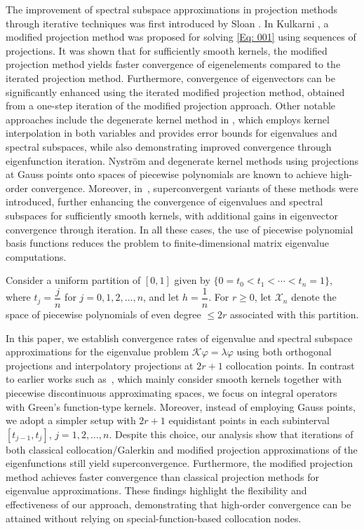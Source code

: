 \documentclass[pdflatex, sn-mathphys-num]{sn-jnl}%
\theoremstyle{thmstyleone}%
\theoremstyle{thmstyletwo}%
\theoremstyle{thmstylethree}%
\begin{document}
The improvement of spectral subspace approximations in projection methods through iterative techniques was first introduced by Sloan \cite{Sloan1}. In Kulkarni \cite{RPK5, RPK6}, a modified projection method was proposed for solving \eqref{Eq: 001} using sequences of projections. It was shown that for sufficiently smooth kernels, the modified projection method yields faster convergence of eigenelements compared to the iterated projection method. Furthermore, convergence of eigenvectors can be significantly enhanced using the iterated modified projection method, obtained from a one-step iteration of the modified projection approach. Other notable approaches include the degenerate kernel method in \cite{Gnan1}, which employs kernel interpolation in both variables and provides error bounds for eigenvalues and spectral subspaces, while also demonstrating improved convergence through eigenfunction iteration. Nystr\"om and degenerate kernel methods using projections at Gauss points onto spaces of piecewise polynomials are known to achieve high-order convergence. Moreover, in~\cite{CA-PS-DS-MT}, superconvergent variants of these methods were introduced, further enhancing the convergence of eigenvalues and spectral subspaces for sufficiently smooth kernels, with additional gains in eigenvector convergence through iteration. In all these cases, the use of piecewise polynomial basis functions reduces the problem to finite-dimensional matrix eigenvalue computations.


Consider a uniform partition of $[0,1]$ given by $\{0 = t_0 < t_1 < \cdots < t_n = 1\}$, where $t_j = \dfrac{j}{n}$ for $j = 0, 1, 2, \ldots, n$, and let $h = \dfrac{1}{n}$. For $r \geq 0$, let $\mathcal{X}_n$ denote the space of piecewise polynomials of even degree $\leq 2r$ associated with this partition.  

In this paper, we establish convergence rates of eigenvalue and spectral subspace approximations for the eigenvalue problem \(\mathcal{K} \varphi = \lambda \varphi\) using both orthogonal projections and interpolatory projections at \(2r+1\) collocation points. In contrast to earlier works such as~\cite{RPK5,RPK6}, which mainly consider smooth kernels together with piecewise discontinuous approximating spaces, we focus on integral operators with Green's function-type kernels. Moreover, instead of employing Gauss points, we adopt a simpler setup with \(2r+1\) equidistant points in each subinterval \([t_{j-1}, t_j]\), \(j=1,2,\ldots,n\). Despite this choice, our analysis show that iterations of both classical collocation/Galerkin and modified projection approximations of the eigenfunctions still yield superconvergence. Furthermore, the modified projection method achieves faster convergence than classical projection methods for eigenvalue approximations. These findings highlight the flexibility and effectiveness of our approach, demonstrating that high-order convergence can be attained without relying on special-function-based collocation nodes.
\end{document}
